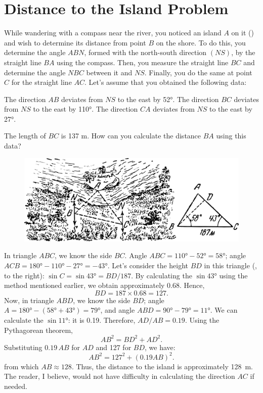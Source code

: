 \section{Distance to the Island Problem}
\label{sec-5.5}

While wandering with a compass near the river, you noticed an island $A$ on it () and wish to determine its distance from point $B$ on the shore. To do this, you determine the angle $ABN$, formed with the north-south direction $(NS)$, by the straight line $BA$ using the compass. Then, you measure the straight line $BC$ and determine the angle $NBC$ between it and $NS$. Finally, you do the same at point $C$ for the straight line $AC$. Let's assume that you obtained the following data:

The direction $AB$ deviates from $NS$ to the east by \ang{52}.
The direction $BC$ deviates from $NS$ to the east by \ang{110}.
The direction $CA$ deviates from $NS$ to the east by \ang{27}.


The length of $BC$ is 137 m. How can you calculate the distance $BA$ using this data?

\begin{figure}[h!]
\centering
\includegraphics[width=\textwidth]{figures/ch-05/fig-093.pdf}
\end{figure}

\ans In triangle $ABC$, we know the side $BC$. Angle $ABC = \ang{110} - \ang{52} = \ang{58}$; angle $ACB = \ang{180} − \ang{110} − \ang{27} = -\ang{43}$. Let's consider the height $BD$ in this triangle (, to the right): $\sin C = \sin \ang{43} = BD/187$. By calculating the $\sin \ang{43}$ using the method mentioned earlier, we obtain approximately 0.68. Hence, 
\begin{equation*}%
BD = 187 \times 0.68 = 127.
\end{equation*}
Now, in triangle $ABD$, we know the side $BD$; angle $A = \ang{180} − (\ang{58} + \ang{43}) = \ang{79}$, and angle $ABD = \ang{90} − \ang{79} = \ang{11}$. We can calculate the $\sin \ang{11}$: it is 0.19. Therefore, $AD/AB = 0.19$. Using the Pythagorean theorem, 
\begin{equation*}%
AB^{2} = BD^{2} + AD^{2}.
\end{equation*}
Substituting $0.19 \, AB$ for $AD$ and 127 for $BD$, we have: 
\begin{equation*}%
AB^{2} = 127^{2} + (0.19AB)^{2}.
\end{equation*}
from which $AB \approx 128$. Thus, the distance to the island is approximately \SI{128}{\meter}. The reader, I believe, would not have difficulty in calculating the direction $AC$ if needed.

